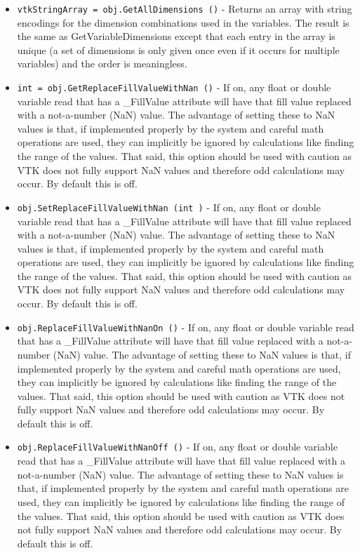 \begin{itemize}
\item  \verb|vtkStringArray = obj.GetAllDimensions ()| -  Returns an array with string encodings for the dimension combinations used
 in the variables.  The result is the same as GetVariableDimensions except
 that each entry in the array is unique (a set of dimensions is only given
 once even if it occurs for multiple variables) and the order is
 meaningless.

\item  \verb|int = obj.GetReplaceFillValueWithNan ()| -  If on, any float or double variable read that has a \_FillValue attribute
 will have that fill value replaced with a not-a-number (NaN) value.  The
 advantage of setting these to NaN values is that, if implemented properly
 by the system and careful math operations are used, they can implicitly be
 ignored by calculations like finding the range of the values.  That said,
 this option should be used with caution as VTK does not fully support NaN
 values and therefore odd calculations may occur.  By default this is off.

\item  \verb|obj.SetReplaceFillValueWithNan (int )| -  If on, any float or double variable read that has a \_FillValue attribute
 will have that fill value replaced with a not-a-number (NaN) value.  The
 advantage of setting these to NaN values is that, if implemented properly
 by the system and careful math operations are used, they can implicitly be
 ignored by calculations like finding the range of the values.  That said,
 this option should be used with caution as VTK does not fully support NaN
 values and therefore odd calculations may occur.  By default this is off.

\item  \verb|obj.ReplaceFillValueWithNanOn ()| -  If on, any float or double variable read that has a \_FillValue attribute
 will have that fill value replaced with a not-a-number (NaN) value.  The
 advantage of setting these to NaN values is that, if implemented properly
 by the system and careful math operations are used, they can implicitly be
 ignored by calculations like finding the range of the values.  That said,
 this option should be used with caution as VTK does not fully support NaN
 values and therefore odd calculations may occur.  By default this is off.

\item  \verb|obj.ReplaceFillValueWithNanOff ()| -  If on, any float or double variable read that has a \_FillValue attribute
 will have that fill value replaced with a not-a-number (NaN) value.  The
 advantage of setting these to NaN values is that, if implemented properly
 by the system and careful math operations are used, they can implicitly be
 ignored by calculations like finding the range of the values.  That said,
 this option should be used with caution as VTK does not fully support NaN
 values and therefore odd calculations may occur.  By default this is off.

\end{itemize}
